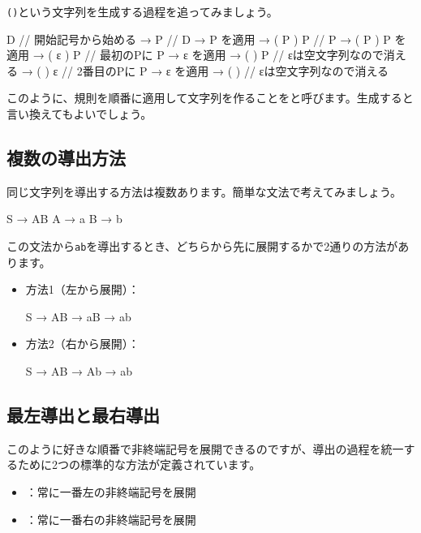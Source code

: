 \texttt{()}という文字列を生成する過程を追ってみましょう。

\begin{codescreen}{}
D               // 開始記号から始める
→ P            // D → P を適用
→ ( P ) P      // P → ( P ) P を適用
→ ( ε ) P     // 最初のPに P → ε を適用
→ ( ) P        // εは空文字列なので消える
→ ( ) ε       // 2番目のPに P → ε を適用  
→ ( )          // εは空文字列なので消える
\end{codescreen}

このように、規則を順番に適用して文字列を作ることをと呼びます。生成すると言い換えてもよいでしょう。

\subsection{複数の導出方法}

同じ文字列を導出する方法は複数あります。簡単な文法で考えてみましょう。

\begin{codescreen}{}
S → AB
A → a
B → b
\end{codescreen}

この文法から\texttt{ab}を導出するとき、どちらから先に展開するかで2通りの方法があります。

\begin{itemize}
\item
  方法1（左から展開）：
\begin{codescreen}{}
S → AB → aB → ab
\end{codescreen}
\item
  方法2（右から展開）：
\begin{codescreen}{}
S → AB → Ab → ab
\end{codescreen}
\end{itemize}

\subsection{最左導出と最右導出}

このように好きな順番で非終端記号を展開できるのですが、導出の過程を統一するために2つの標準的な方法が定義されています。

\begin{itemize}
\item
  ：常に一番左の非終端記号を展開
\item
  ：常に一番右の非終端記号を展開
\end{itemize}

